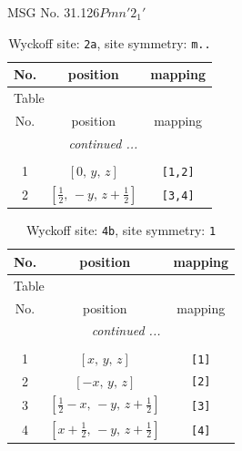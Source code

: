 \documentclass[fleqn,8pt]{jsarticle}
\begin{document}
\setcounter{MaxMatrixCols}{32}

\renewcommand{\tablename}{Table~}
\renewcommand{\figurename}{Figure~}
\begin{center}
\LARGE
MSG No. 31.126\quad$Pmn'2_{1}'$
\end{center}
\renewcommand{\arraystretch}{1.2}
\begin{longtable}{ccc}
\caption{Wyckoff site: {\tt 2a}, site symmetry: {\tt m..}}
 \\
 \hline \hline
No. & position & mapping \\ \hline \endfirsthead

\multicolumn{2}{l}{\tablename\ \thetable{}} \\
 \hline \hline
No. & position & mapping \\ \hline \endhead

 \hline \hline
\multicolumn{2}{r}{\footnotesize\it continued ...} \\ \endfoot

 \hline \hline
\multicolumn{2}{r}{} \\ \endlastfoot

1 & $\left[ 0,\, y,\, z \right]$ & {\tt [1,2]} \\ \hline
2 & $\left[ \frac{1}{2},\, - y,\, z + \frac{1}{2} \right]$ & {\tt [3,4]} \\
\end{longtable}
\renewcommand{\arraystretch}{1.2}
\begin{longtable}{ccc}
\caption{Wyckoff site: {\tt 4b}, site symmetry: {\tt 1}}
 \\
 \hline \hline
No. & position & mapping \\ \hline \endfirsthead

\multicolumn{2}{l}{\tablename\ \thetable{}} \\
 \hline \hline
No. & position & mapping \\ \hline \endhead

 \hline \hline
\multicolumn{2}{r}{\footnotesize\it continued ...} \\ \endfoot

 \hline \hline
\multicolumn{2}{r}{} \\ \endlastfoot

1 & $\left[ x,\, y,\, z \right]$ & {\tt [1]} \\ \hline
2 & $\left[ - x,\, y,\, z \right]$ & {\tt [2]} \\ \hline
3 & $\left[ \frac{1}{2} - x,\, - y,\, z + \frac{1}{2} \right]$ & {\tt [3]} \\ \hline
4 & $\left[ x + \frac{1}{2},\, - y,\, z + \frac{1}{2} \right]$ & {\tt [4]} \\
\end{longtable}
\end{document}
